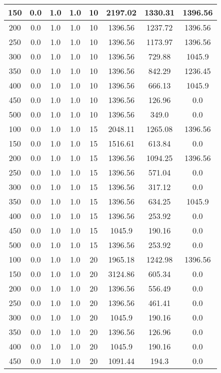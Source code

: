 \documentclass[a4paper, 12pt]{extreport}
\begin{document}
\begin{itemize}
\begin{longtable}{|c|c|c|c|c|c|c|c|}
			150 & 0.0 & 1.0 & 1.0 & 10 & 2197.02 & 1330.31 & 1396.56 \\\hline
			200 & 0.0 & 1.0 & 1.0 & 10 & 1396.56 & 1237.72 & 1396.56 \\\hline
			250 & 0.0 & 1.0 & 1.0 & 10 & 1396.56 & 1173.97 & 1396.56 \\\hline
			300 & 0.0 & 1.0 & 1.0 & 10 & 1396.56 & 729.88 & 1045.9 \\\hline
			350 & 0.0 & 1.0 & 1.0 & 10 & 1396.56 & 842.29 & 1236.45 \\\hline
			400 & 0.0 & 1.0 & 1.0 & 10 & 1396.56 & 666.13 & 1045.9 \\\hline
			450 & 0.0 & 1.0 & 1.0 & 10 & 1396.56 & 126.96 & 0.0 \\\hline
			500 & 0.0 & 1.0 & 1.0 & 10 & 1396.56 & 349.0 & 0.0 \\\hline
			100 & 0.0 & 1.0 & 1.0 & 15 & 2048.11 & 1265.08 & 1396.56 \\\hline
			150 & 0.0 & 1.0 & 1.0 & 15 & 1516.61 & 613.84 & 0.0 \\\hline
			200 & 0.0 & 1.0 & 1.0 & 15 & 1396.56 & 1094.25 & 1396.56 \\\hline
			250 & 0.0 & 1.0 & 1.0 & 15 & 1396.56 & 571.04 & 0.0 \\\hline
			300 & 0.0 & 1.0 & 1.0 & 15 & 1396.56 & 317.12 & 0.0 \\\hline
			350 & 0.0 & 1.0 & 1.0 & 15 & 1396.56 & 634.25 & 1045.9 \\\hline
			400 & 0.0 & 1.0 & 1.0 & 15 & 1396.56 & 253.92 & 0.0 \\\hline
			450 & 0.0 & 1.0 & 1.0 & 15 & 1045.9 & 190.16 & 0.0 \\\hline
			500 & 0.0 & 1.0 & 1.0 & 15 & 1396.56 & 253.92 & 0.0 \\\hline
			100 & 0.0 & 1.0 & 1.0 & 20 & 1965.18 & 1242.98 & 1396.56 \\\hline
			150 & 0.0 & 1.0 & 1.0 & 20 & 3124.86 & 605.34 & 0.0 \\\hline
			200 & 0.0 & 1.0 & 1.0 & 20 & 1396.56 & 556.49 & 0.0 \\\hline
			250 & 0.0 & 1.0 & 1.0 & 20 & 1396.56 & 461.41 & 0.0 \\\hline
			300 & 0.0 & 1.0 & 1.0 & 20 & 1045.9 & 190.16 & 0.0 \\\hline
			350 & 0.0 & 1.0 & 1.0 & 20 & 1396.56 & 126.96 & 0.0 \\\hline
			400 & 0.0 & 1.0 & 1.0 & 20 & 1045.9 & 190.16 & 0.0 \\\hline
			450 & 0.0 & 1.0 & 1.0 & 20 & 1091.44 & 194.3 & 0.0 \\\hline

\end{longtable}
\end{itemize}
\end{document}

